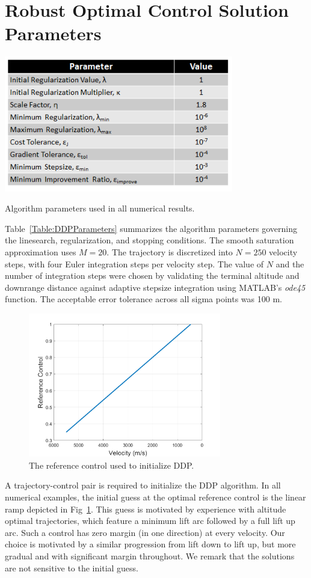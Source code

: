\section{Robust Optimal Control Solution Parameters}
\begin{table}[h!]
	\centering
	\includegraphics[width=0.75\textwidth]{Images/DDP_Parameters}
	\caption{Algorithm parameters used in all numerical results.}
	\label{Table:DDPParameters}
\end{table}
Table~\ref{Table:DDPParameters} summarizes the algorithm parameters governing the linesearch, regularization, and stopping conditions. 
The smooth saturation approximation uses $M = 20$. The trajectory is discretized into $ N=250 $ velocity steps, with four Euler integration steps per velocity step. The value of $ N $ and the number of integration steps were chosen by validating the terminal altitude and downrange distance against adaptive stepsize integration using MATLAB's \textit{ode45} function. The acceptable error tolerance across all sigma points was 100 m.

\begin{figure}[h!]
	\centering
	\includegraphics[width=0.75\textwidth]{Images/GuessControl}
	\caption{The reference control used to initialize DDP.}
	\label{Fig:GuessControl}
\end{figure}
A trajectory-control pair is required to initialize the DDP algorithm. In all numerical examples, the initial guess at the optimal reference control is the linear ramp depicted in Fig~\ref{Fig:GuessControl}. This guess is motivated by experience with altitude optimal trajectories, which feature a minimum lift arc followed by a full lift up arc. Such a control has zero margin (in one direction) at every velocity. Our choice is motivated by a similar progression from lift down to lift up, but more gradual and with significant margin throughout. We remark that the solutions are not sensitive to the initial guess. 

